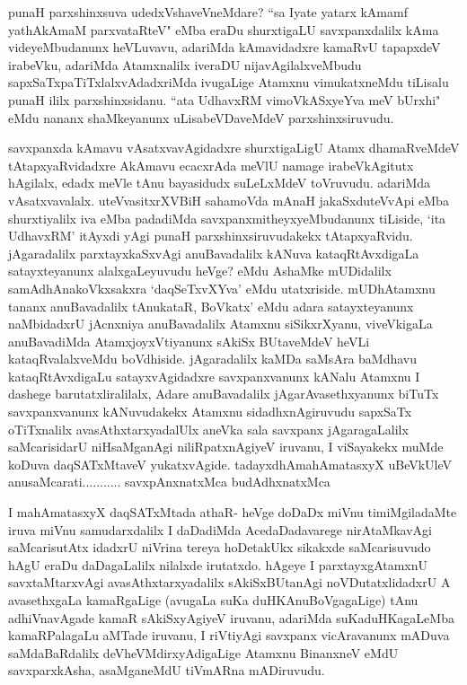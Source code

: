 \begin{artha}
punaH parxshinxsuva udedxVshaveVneMdare? ``sa Iyate yatarx kAmamf yathAkAmaM parxvataRteV" eMba eraDu shurxtigaLU savxpanxdalilx kAma videyeMbudanunx heVLuvavu, adariMda kAmavidadxre kamaRvU tapapxdeV irabeVku, adariMda Atamxnalilx iveraDU nijavAgilalxveMbudu sapxSaTxpaTiTxlalxvAdadxriMda ivugaLige Atamxnu vimukatxneMdu tiLisalu punaH ililx parxshinxsidanu. ``ata UdhavxRM vimoVkASxyeYva meV bUrxhi" eMdu nananx shaMkeyanunx uLisabeVDaveMdeV parxshinxsiruvudu.
\end{artha}

\begin{artha}
savxpanxda kAmavu vAsatxvavAgidadxre shurxtigaLigU Atamx dhamaRveMdeV tAtapxyaRvidadxre AkAmavu ecacxrAda meVlU namage irabeVkAgitutx hAgilalx, edadx meVle tAnu bayasidudx suLeLxMdeV toVruvudu. adariMda vAsatxvavalalx. uteVvasitxrXVBiH sahamoVda mAnaH jakaSxduteVvApi eMba shurxtiyalilx iva eMba padadiMda savxpanxmitheyxyeMbudanunx tiLiside, `ita UdhavxRM' itAyxdi yAgi punaH parxshinxsiruvudakekx tAtapxyaRvidu. jAgaradalilx parxtayxkaSxvAgi anuBavadalilx kANuva kataqRtAvxdigaLa satayxteyanunx alalxgaLeyuvudu heVge? eMdu AshaMke mUDidalilx samAdhAnakoVkxsakxra `daqSeTxvXYva' eMdu utatxriside. mUDhAtamxnu tananx anuBavadalilx tAnukataR, BoVkatx' eMdu adara satayxteyanunx naMbidadxrU jAcnxniya anuBavadalilx Atamxnu siSikxrXyanu, viveVkigaLa anuBavadiMda AtamxjoyxVtiyanunx sAkiSx BUtaveMdeV heVLi kataqRvalalxveMdu boVdhiside. jAgaradalilx kaMDa saMsAra baMdhavu kataqRtAvxdigaLu satayxvAgidadxre savxpanxvanunx kANalu Atamxnu I dashege barutatxliralilalx, Adare anuBavadalilx jAgarAvasethxyanunx biTuTx savxpanxvanunx kANuvudakekx Atamxnu sidadhxnAgiruvudu sapxSaTx oTiTxnalilx avasAthxtarxyadalUlx aneVka sala savxpanx jAgaragaLalilx saMcarisidarU niHsaMganAgi niliRpatxnAgiyeV iruvanu, I viSayakekx muMde koDuva daqSATxMtaveV yukatxvAgide. 
tadayxdhAmahAmatasxyX uBeVkUleV anusaMcarati........... savxpAnxnatxMca budAdhxnatxMca
\end{artha}%

\begin{artha}
I mahAmatasxyX daqSATxMtada athaR- heVge doDaDx miVnu timiMgiladaMte iruva miVnu samudarxdalilx I daDadiMda AcedaDadavarege nirAtaMkavAgi saMcarisutAtx idadxrU niVrina tereya hoDetakUkx sikakxde saMcarisuvudo hAgU eraDu daDagaLalilx nilalxde irutatxdo. hAgeye I parxtayxgAtamxnU savxtaMtarxvAgi avasAthxtarxyadalilx sAkiSxBUtanAgi noVDutatxlidadxrU A avasethxgaLa kamaRgaLige (avugaLa suKa duHKAnuBoVgagaLige) tAnu adhiVnavAgade kamaR sAkiSxyAgiyeV iruvanu, adariMda suKaduHKagaLeMba kamaRPalagaLu aMTade iruvanu, I riVtiyAgi savxpanx vicAravanunx mADuva saMdaBaRdalilx deVheVMdirxyAdigaLige Atamxnu BinanxneV eMdU savxparxkAsha, asaMganeMdU tiVmARna mADiruvudu. 
\end{artha}%

